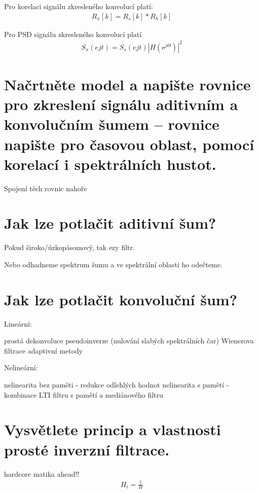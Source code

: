 \documentclass[a4paper,12pt]{article}   %
\newcommand{\ejt}{\text{e}^{j\Theta}}
\begin{document}
Pro korelaci signálu zkresleného konvolucí platí:
\begin{align*}
        R_x[k] = R_s[k]\ast R_h[k]
\end{align*}

Pro PSD signálu zkresleného konvolucí platí
\begin{align*}
        S_x(ejt) = S_s(ejt)|H(\ejt)|^2
\end{align*}


\section{Načrtněte model a napište rovnice pro zkreslení signálu aditivním a konvolučním šumem – rovnice napište pro časovou oblast, pomocí korelací i spektrálních hustot.}

Spojení těch rovnic nahoře


\section{Jak lze potlačit aditivní šum?}
Pokud široko/úzkopásomový, tak ezy filtr. 

Nebo odhadneme spektrum šumu a ve spektrální oblasti ho odečteme.


\section{Jak lze potlačit konvoluční šum?}

Lineární:
\begin{outline}
        \1 prostá dekonvoluce
        \1 pseudoinverze (nulování slabých spektrálních čar)
        \1 Wienerova filtrace 
        \1 adaptivní metody
\end{outline}

Nelineární:
\begin{outline}
        \1 nelinearita bez paměti - redukce odlehlých hodnot
        \1 nelinearita s pamětí - kombinace LTI filtru s pamětí a mediánového filtru
\end{outline}


\section{Vysvětlete princip a vlastnosti prosté inverzní filtrace.}

hardcore matika ahead!!
\begin{align*}
        H_i = \frac{1}{H}
\end{align*}
\end{document}
